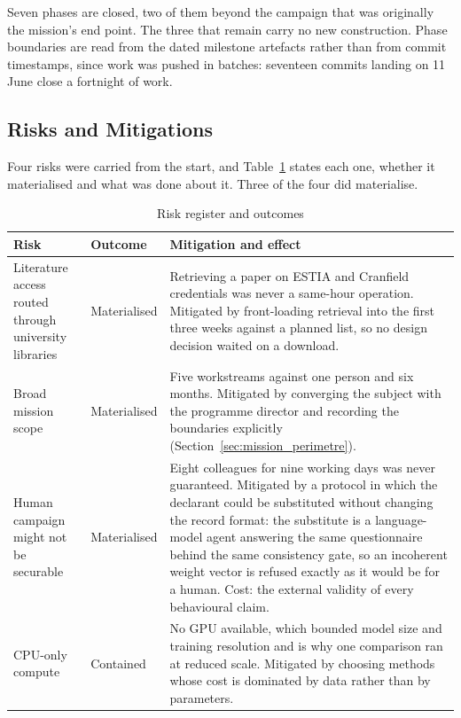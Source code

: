Seven phases are closed, two of them beyond the campaign that was originally the mission's end
point. The three that remain carry no new construction. Phase boundaries are read from the
dated milestone artefacts rather than from commit timestamps, since work was pushed in
batches: seventeen commits landing on 11 June close a fortnight of work.


\subsection{Risks and Mitigations}
\label{sec:risques}

Four risks were carried from the start, and Table~\ref{tab:risques} states each one, whether
it materialised and what was done about it. Three of the four did materialise.

\begin{table}[H]
\centering
\caption{Risk register and outcomes}
\label{tab:risques}
\small
\begin{tabularx}{\linewidth}{>{\raggedright\arraybackslash}p{3.5cm} >{\raggedright\arraybackslash}p{1.8cm} X}
\toprule
\textbf{Risk} & \textbf{Outcome} & \textbf{Mitigation and effect} \\
\midrule
Literature access routed through university libraries & Materialised & Retrieving a paper on
ESTIA and Cranfield credentials was never a same-hour operation. Mitigated by front-loading
retrieval into the first three weeks against a planned list, so no design decision waited on a
download. \\[3pt]
\midrule
Broad mission scope & Materialised & Five workstreams against one person and six months.
Mitigated by converging the subject with the programme director and recording the boundaries
explicitly (Section~\ref{sec:mission_perimetre}). \\[3pt]
\midrule
Human campaign might not be securable & Materialised & Eight colleagues for nine working days
was never guaranteed. Mitigated by a protocol in which the declarant could be substituted
without changing the record format: the substitute is a language-model agent answering the
same questionnaire behind the same consistency gate, so an incoherent weight vector is refused
exactly as it would be for a human. Cost: the external validity of every behavioural
claim. \\[3pt]
\midrule
CPU-only compute & Contained & No GPU available, which bounded model size and training
resolution and is why one comparison ran at reduced scale. Mitigated by choosing methods whose
cost is dominated by data rather than by parameters. \\
\bottomrule
\end{tabularx}
\end{table}

